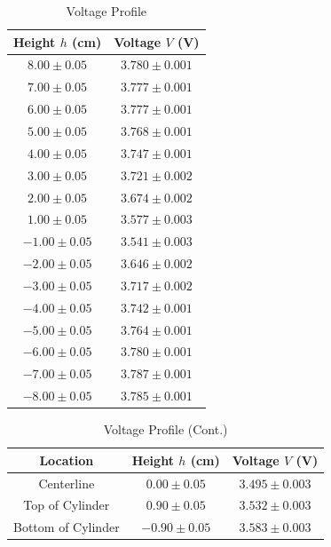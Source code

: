 \documentclass[journal,letterpaper]{IEEEtran}
\renewcommand{\arraystretch}{1.3}
\begin{document}
\begin{table}[H]
    \centering
    \caption{Voltage Profile}
    \renewcommand{\arraystretch}{1.11}
    \begin{tabular}{cc}
    \toprule
    Height $h$ (cm) & Voltage $V$ (V) \\ \midrule \midrule
    $8.00 \pm 0.05 $ & $3.780 \pm 0.001$ \\
    $7.00 \pm 0.05 $ & $3.777 \pm 0.001$ \\
    $6.00 \pm 0.05 $ & $3.777 \pm 0.001$ \\
    $5.00 \pm 0.05 $ & $3.768 \pm 0.001$ \\
    $4.00 \pm 0.05 $ & $3.747 \pm 0.001$ \\
    $3.00 \pm 0.05 $ & $3.721 \pm 0.002$ \\
    $2.00 \pm 0.05 $ & $3.674 \pm 0.002$ \\
    $1.00 \pm 0.05 $ & $3.577 \pm 0.003$ \\
    $-1.00 \pm 0.05$ & $3.541 \pm 0.003$ \\
    $-2.00 \pm 0.05$ & $3.646 \pm 0.002$ \\
    $-3.00 \pm 0.05$ & $3.717 \pm 0.002$ \\
    $-4.00 \pm 0.05$ & $3.742 \pm 0.001$ \\
    $-5.00 \pm 0.05$ & $3.764 \pm 0.001$ \\
    $-6.00 \pm 0.05$ & $3.780 \pm 0.001$ \\
    $-7.00 \pm 0.05$ & $3.787 \pm 0.001$ \\
    $-8.00 \pm 0.05$ & $3.785 \pm 0.001$ \\ \bottomrule
    \end{tabular}
    \label{tab:voltage}
\end{table}

\begin{table}[H]
    \centering
    \caption{Voltage Profile (Cont.)}
    \begin{tabular}{ccc}
    \toprule
    Location & Height $h$ (cm) & Voltage $V$ (V) \\ \midrule \midrule
    Centerline & $0.00 \pm 0.05$ & $3.495 \pm 0.003$ \\
    Top of Cylinder & $0.90 \pm 0.05$ & $3.532 \pm 0.003$ \\
    Bottom of Cylinder & $-0.90 \pm 0.05$ & $3.583 \pm 0.003$ \\ \bottomrule
    \end{tabular}
    \label{tab:voltages}
\end{table}
\end{document}
